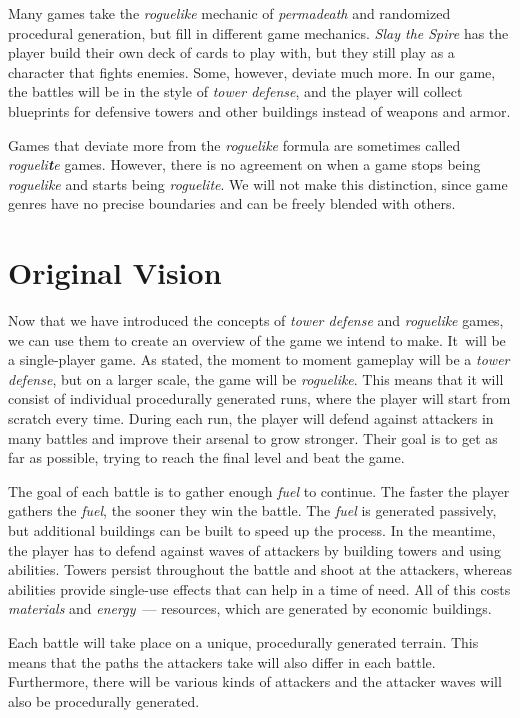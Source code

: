 Many games take the \emph{roguelike} mechanic of \emph{permadeath} and randomized procedural generation, but fill in different game mechanics.
\emph{Slay the Spire} has the player build their own deck of cards to play with, but they still play as a character that fights enemies.
Some, however, deviate much more.
In our game, the battles will be in the style of \emph{tower defense}, and the player will collect blueprints for defensive towers and other buildings instead of weapons and armor.

Games that deviate more from the \emph{roguelike} formula are sometimes called \emph{rogueli\textbf{t}e} games.
However, there is no agreement on when a game stops being \emph{roguelike} and starts being \emph{roguelite}.
We will not make this distinction, since game genres have no precise boundaries and can be freely blended with others.

\section{Original Vision} \label{sec:original-vision}

Now that we have introduced the concepts of \emph{tower defense} and \emph{roguelike} games, we can use them to create an overview of the game we intend to make.
It~will be a single-player game.
As stated, the moment to moment gameplay will be a \emph{tower defense}, but on a larger scale, the game will be \emph{roguelike}.
This means that it will consist of individual procedurally generated runs, where the player will start from scratch every time.
During each run, the player will defend against attackers in many battles and improve their arsenal to grow stronger.
Their goal is to get as far as possible, trying to reach the final level and beat the game.

The goal of each battle is to gather enough \emph{fuel} to continue.
The faster the player gathers the \emph{fuel}, the sooner they win the battle.
The \emph{fuel} is generated passively, but additional buildings can be built to speed up the process.
In the meantime, the player has to defend against waves of attackers by building towers and using abilities.
Towers persist throughout the battle and shoot at the attackers, whereas abilities provide single-use effects that can help in a time of need.
All of this costs \emph{materials} and \emph{energy}~--- resources, which are generated by economic buildings.

Each battle will take place on a unique, procedurally generated terrain.
This means that the paths the attackers take will also differ in each battle.
Furthermore, there will be various kinds of attackers and the attacker waves will also be procedurally generated.

